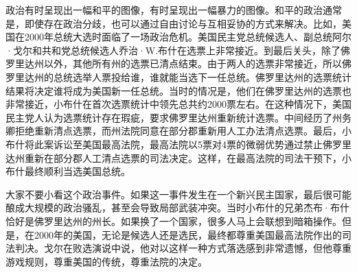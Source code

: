 





政治有时呈现出一幅和平的图像，有时呈现出一幅暴力的图像。和平的政治通常是，即使存在政治分歧，也可以通过自由讨论与互相妥协的方式来解决。比如，美国在2000年总统大选时面临了一场政治危机。美国民主党总统候选人、副总统阿尔·戈尔和共和党总统候选人乔治·W.布什在选票上非常接近。到最后关头，除了佛罗里达州以外，其他所有州的选票已清点结束。由于两人的选票非常接近，所以佛罗里达州的总统选举人票投给谁，谁就能当选下一任总统。佛罗里达州的选票统计结果将决定谁将成为美国新一任总统。当时的情况是，他们在佛罗里达州的选票也非常接近，小布什在首次选票统计中领先总共约2000票左右。在这种情况下，美国民主党人认为选票统计存在瑕疵，要求佛罗里达州重新统计选票。中间经历了州务卿拒绝重新清点选票，而州法院同意在部分郡重新用人工办法清点选票。最后，小布什将此案诉讼至美国最高法院，最高法院以5票对4票的微弱优势通过禁止佛罗里达州重新在部分郡人工清点选票的司法决定。这样，在最高法院的司法干预下，小布什最终顺利当选美国总统。

大家不要小看这个政治事件。如果这一事件发生在一个新兴民主国家，最后很可能酿成大规模的政治骚乱，甚至会导致局部武装冲突。当时小布什的兄弟杰布·布什恰好是佛罗里达州的州长。如果换了一个国家，很多人马上会联想到暗箱操作。但是，在2000年的美国，无论是候选人还是选民，最终都尊重美国最高法院作出的司法判决。戈尔在败选演说中说，他对以这样一种方式落选感到非常遗憾，但他尊重游戏规则，尊重美国的传统，尊重法院的决定。

